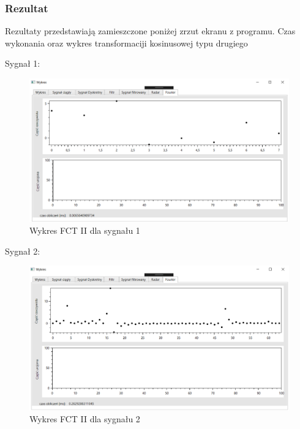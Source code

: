 \documentclass[12pt]{article}
\begin{document}
\subsubsection{Rezultat}

Rezultaty przedstawiają zamieszczone poniżej zrzut ekranu z programu. Czas wykonania oraz wykres transformaciji kosinusowej typu drugiego

 Sygnał 1:
\begin{figure}[h!]
 \centering
 \includegraphics[width=12.3cm]{s13FCT2.PNG}
 \vspace{-0.3cm}
 \caption{Wykres FCT II dla sygnału 1}
 \label{Wykres dla wyników eksperymentu pierwszego}
\end{figure}

Sygnał 2:
\begin{figure}[h!]
 \centering
 \includegraphics[width=12.3cm]{s16FCT2.PNG}
 \vspace{-0.3cm}
 \caption{Wykres FCT II dla sygnału 2}
 \label{Wykres dla wyników eksperymentu pierwszego}
\end{figure}
\end{document}
